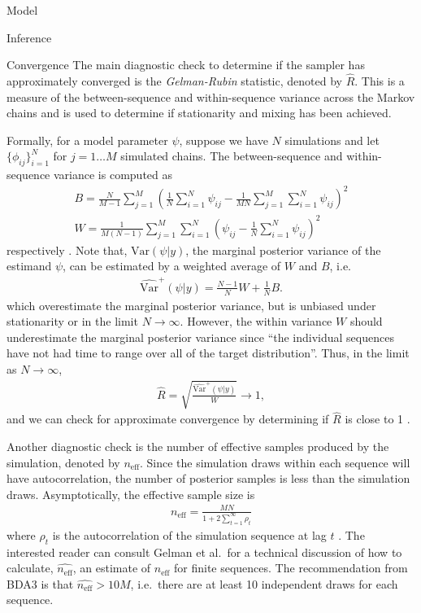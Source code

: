 \begin{chapter}{Model}
\begin{section}{Inference}
\begin{subsection}{Convergence}
    The main diagnostic check to determine if the sampler has approximately converged
    is the \emph{Gelman-Rubin} statistic, denoted by $\hat{R}$. This is a measure of
    the between-sequence and within-sequence variance across the Markov chains and is used to determine
    if stationarity and mixing has been achieved.

    Formally, for a model parameter $\psi$, suppose we have $N$ simulations
    and let $\{\phi_{ij}\}_{i=1}^{N}$ for $j=1\dots M$ simulated chains.
    The between-sequence and within-sequence variance is computed as
    \begin{align*}
      B = \frac{N}{M-1}\sum_{j=1}^M \left(\frac{1}{N}\sum_{i=1}^N\psi_{ij} - \frac{1}{MN}\sum_{j=1}^M \sum_{i=1}^N\psi_{ij}\right)^2 \\
      W = \frac{1}{M(N-1)}\sum_{j=1}^M\sum_{i=1}^N\left(\psi_{ij} - \frac{1}{N}\sum_{i=1}^N\psi_{ij}\right)^2
    \end{align*}
    respectively \cite{bda3}.
    Note that, $\text{Var}(\psi | y)$, the marginal posterior variance of the estimand $\psi$,
    can be estimated by a weighted average of $W$ and $B$, i.e.\
    \begin{align*}
      \hat{\text{Var}}^+(\psi | y) = \frac{N -1}{N} W + \frac{1}{N} B.
    \end{align*}
    which overestimate the marginal posterior variance, but is unbiased under stationarity
    or in the limit $N \to \infty$. However, the within variance $W$ should underestimate
    the marginal posterior variance since ``the individual sequences have not had time to range over
    all of the target distribution''. Thus, in the limit as $N \to \infty$,
    \begin{align}\label{form:rhat}
      \hat{R} = \sqrt{\frac{\hat{\text{Var}}^+(\psi | y)}{W}} \to 1,
    \end{align}
    and we can check for approximate convergence by determining if $\hat{R}$ is close to 1 \cite{bda3}.

    Another diagnostic check is the number of effective samples produced by the simulation, denoted
    by $n_{\text{eff}}$. Since the simulation draws within each sequence will have autocorrelation,
    the number of posterior samples is less than the simulation draws. Asymptotically, the effective
    sample size is
    \begin{align}\label{form:neff}
      n_{\text{eff}} = \frac{MN}{1 + 2 \sum_{t=1}^\infty \rho_t}
    \end{align}
    where $\rho_t$ is the autocorrelation of the simulation sequence at lag $t$ \cite{bda3}.
    The interested reader can consult Gelman et al.\
    for a technical discussion of how to calculate, $\hat{n_{\text{eff}}}$, an estimate of $n_{\text{eff}}$ for finite sequences.
    The recommendation from BDA3 is that $\hat{n_{\text{eff}}} > 10 M$, i.e.\ there are at least 10 independent
    draws for each sequence.


\end{subsection}
\end{section}
\end{chapter}
